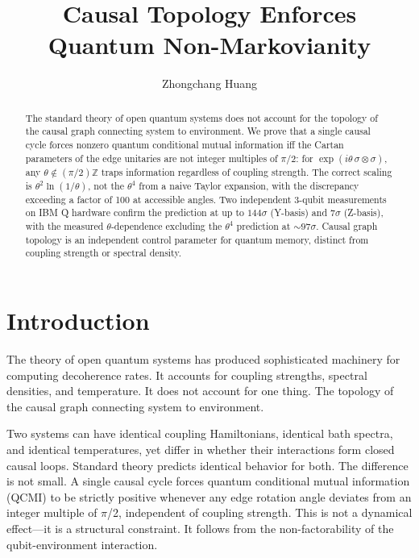 \documentclass[twocolumn,aps,prl,floatfix]{revtex4-2}
\begin{document}
\title{Causal Topology Enforces Quantum Non-Markovianity}

\author{Zhongchang Huang}


\begin{abstract}
The standard theory of open quantum systems does not account for the topology of the causal graph connecting system to environment. We prove that a single causal cycle forces nonzero quantum conditional mutual information iff the Cartan parameters of the edge unitaries are not integer multiples of $\pi$/2: for $\exp(i\theta\,\sigma\otimes\sigma)$, any $\theta\notin(\pi/2)\mathbb{Z}$ traps information regardless of coupling strength. The correct scaling is $\theta^2\ln(1/\theta)$, not the $\theta^4$ from a naive Taylor expansion, with the discrepancy exceeding a factor of 100 at accessible angles. Two independent 3-qubit measurements on IBM Q hardware confirm the prediction at up to $144\sigma$ (Y-basis) and $7\sigma$ (Z-basis), with the measured $\theta$-dependence excluding the $\theta^4$ prediction at ${\sim}97\sigma$. Causal graph topology is an independent control parameter for quantum memory, distinct from coupling strength or spectral density.
\end{abstract}

\maketitle

\section{Introduction}

The theory of open quantum systems has produced sophisticated machinery for computing decoherence rates. It accounts for coupling strengths, spectral densities, and temperature. It does not account for one thing. The topology of the causal graph connecting system to environment.

Two systems can have identical coupling Hamiltonians, identical bath spectra, and identical temperatures, yet differ in whether their interactions form closed causal loops. Standard theory predicts identical behavior for both. The difference is not small. A single causal cycle forces quantum conditional mutual information (QCMI) to be strictly positive whenever any edge rotation angle deviates from an integer multiple of $\pi$/2, independent of coupling strength. This is not a dynamical effect—it is a structural constraint. It follows from the non-factorability of the qubit-environment interaction.
\end{document}
